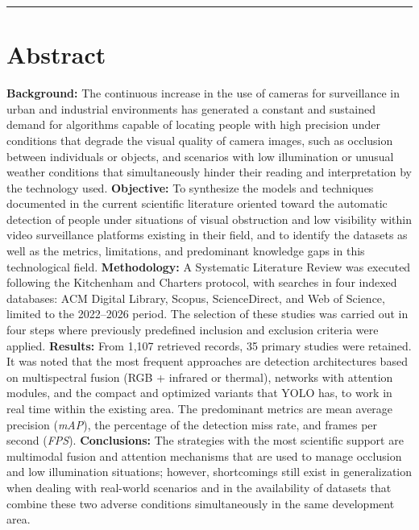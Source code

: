 \documentclass[12pt, a4paper]{article}
\begin{document}
\vspace{0.4em}\noindent\rule{\linewidth}{0.4pt}

\section*{Abstract}
\noindent
\textbf{Background:} The continuous increase in the use of cameras for
surveillance in urban and industrial environments has generated a
constant and sustained demand for algorithms capable of locating
people with high precision under conditions that degrade the visual quality
of camera images, such as occlusion between individuals or
objects, and scenarios with low illumination or unusual weather conditions
that simultaneously hinder their reading and interpretation by the technology used.
\textbf{Objective:} To synthesize the models and techniques documented
in the current scientific literature oriented toward the automatic detection
of people under situations of visual obstruction and low visibility
within video surveillance platforms existing in their field, and to identify
the datasets as well as the metrics, limitations, and predominant knowledge
gaps in this technological field.
\textbf{Methodology:} A Systematic Literature Review was executed following
the Kitchenham and Charters protocol, with searches in four indexed
databases: ACM Digital Library, Scopus, ScienceDirect, and Web of
Science, limited to the 2022--2026 period. The selection of these
studies was carried out in four steps where previously predefined inclusion
and exclusion criteria were applied.
\textbf{Results:} From 1,107 retrieved records, 35 primary studies
were retained. It was noted that the most frequent approaches are detection
architectures based on multispectral fusion (RGB + infrared or thermal),
networks with attention modules, and the compact and optimized variants that YOLO has,
to work in real time within the existing area. The predominant metrics are mean average precision
(\textit{mAP}), the percentage of the detection miss rate, and frames per
second (\textit{FPS}).
\textbf{Conclusions:} The strategies with the most scientific support are multimodal fusion and attention mechanisms that are used
to manage occlusion and low illumination situations; however, shortcomings
still exist in generalization when dealing with real-world scenarios and in
the availability of datasets that combine these two adverse conditions
simultaneously in the same development area.
\end{document}
